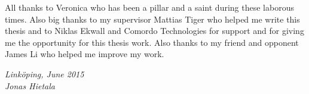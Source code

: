 \begin{acknowledgments}
  All thanks to Veronica who has been a pillar and a saint during these laborous times. Also big thanks to my supervisor Mattias Tiger who helped me write this thesis and to Niklas Ekwall and Comordo Technologies for support and for giving me the opportunity for this thesis work. Also thanks to my friend and opponent James Li who helped me improve my work.

  \addvspace{1em}
  \begin{flushright}
    \textit{%
      Linköping, June 2015\\
      Jonas Hietala%
    }
  \end{flushright}
\end{acknowledgments}
